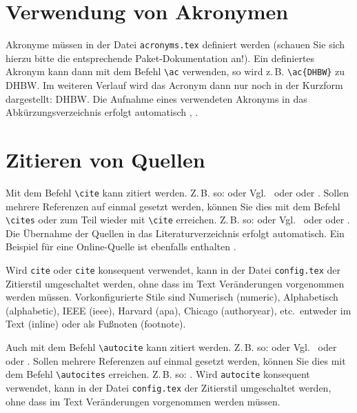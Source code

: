 \section{Verwendung von Akronymen}
Akronyme müssen in der Datei \texttt{acronyms.tex} definiert werden (schauen Sie sich hierzu bitte die entsprechende 
Paket-Dokumentation an!). Ein definiertes Akronym kann dann mit dem Befehl \texttt{\textbackslash ac} verwenden, so wird 
z.\,B. \texttt{\textbackslash ac\{DHBW\}} zu \ac{DHBW}. Im weiteren Verlauf wird das Acronym dann nur noch in der Kurzform 
dargestellt: \ac{DHBW}. Die Aufnahme eines verwendeten Akronyms in das Abkürzungsverzeichnis erfolgt automatisch 
\autocite[Vgl.][S. 77ff]{TestOnlineQuelle}, \autocite[Vgl.][S. 42]{ME12}. 

\section{Zitieren von Quellen}
Mit dem Befehl \texttt{\textbackslash cite} kann zitiert werden. Z.\,B. so: \cite[Vgl.][S.~18ff]{ME12} oder Vgl.~\cite[S.~18ff]{ME12} 
oder \cite[S.~18ff]{ME12} oder \cite{ME12}. Sollen mehrere Referenzen auf einmal gesetzt werden, können Sie dies mit dem 
Befehl \texttt{\textbackslash cites} oder zum Teil wieder mit 
\texttt{\textbackslash cite} erreichen. Z.\,B. so: \cites[Vgl.][S. 10]{ME12}[Vgl.][S. 100]{TD15}  
oder Vgl.~\cite{ME12, TD15} oder oder \cite{ME12, TD15}. Die Übernahme der Quellen in das Literaturverzeichnis erfolgt automatisch. 
Ein Beispiel für eine Online-Quelle ist ebenfalls enthalten \cite{TestOnlineQuelle}.

Wird \texttt{cite} oder \texttt{cite} konsequent verwendet, kann in der Datei \texttt{config.tex} der Zitierstil umgeschaltet 
werden, ohne dass im Text Veränderungen vorgenommen werden müssen. Vorkonfigurierte Stile sind Numerisch (numeric), 
Alphabetisch (alphabetic), IEEE (ieee), Harvard (apa), Chicago (authoryear), etc.~entweder im Text (inline) oder als Fußnoten 
(footnote). 

Auch mit dem Befehl \texttt{\textbackslash autocite} kann zitiert werden. Z.\,B. so: \autocite[Vgl.][S.~18ff]{ME12}
oder Vgl.~\autocite[S.~18ff]{ME12} oder \autocite[S.~18ff]{ME12} oder \autocite{ME12}{.} Sollen mehrere Referenzen auf einmal 
gesetzt werden, können Sie dies mit dem Befehl \texttt{\textbackslash autocites} erreichen. Z.\,B. so:
\autocites[Vgl.][S. 10]{ME12}[][S. 100]{TD15}. Wird \texttt{autocite} konsequent verwendet, kann in der Datei 
\texttt{config.tex} der Zitierstil umgeschaltet werden, ohne dass im Text Veränderungen vorgenommen werden müssen. 

